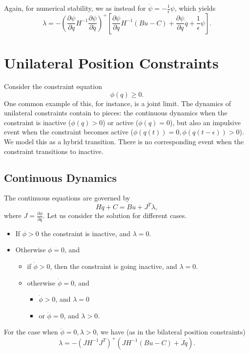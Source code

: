 \documentclass{article}
\newcommand{\pd}[2]{\frac{\partial #1}{\partial #2}}
\begin{document}
Again, for numerical stability, we as instead for $\dot{\psi} =
-\frac{1}{\epsilon} \psi$, which yields
$$\lambda = - \left( \pd{\psi}{\dot{q}} H^{-1} \pd{\psi}{\dot{q}}
  \right)^+ \left[ \pd{\psi}{\dot{q}} H^{-1} (Bu - C) + \pd{\psi}{q}
    \dot{q} + \frac{1}{\epsilon} \psi \right].$$

\section{Unilateral Position Constraints}

Consider the constraint equation $$\phi(q) \ge 0.$$ One common example
of this, for instance, is a joint limit.  The dynamics of unilateral
constraints contain to pieces: the continuous dynamics when the
constraint is inactive ($\phi(q) > 0$) or active ($\phi(q) = 0$), but
also an impulsive event when the constraint becomes active
($\phi(q(t))=0, \phi(q(t-\epsilon))>0$).  We model this as a hybrid
transition.  There is no corresponding
event when the constraint transitions to inactive.  

\subsection{Continuous Dynamics}

The continuous equations are governed by $$H\ddot{q} + C = B u + J^T
\lambda,$$ where $J = \pd{\phi}{q}$.  
Let us consider the solution for different cases.  
\begin{itemize}
\item If $\phi > 0$ the constraint is inactive, and $\lambda = 0$.  
\item Otherwise $\phi = 0$, and 
\begin{itemize}
\item if $\dot{\phi} > 0$, then the constraint is going inactive, and
  $\lambda = 0$.  
\item otherwise $\dot{\phi} = 0$, and 
\begin{itemize}
\item $\ddot{\phi} > 0$, and $\lambda = 0$
\item or $\ddot{\phi} = 0$, and $\lambda > 0$.  
\end{itemize}
\end{itemize}
\end{itemize}
For the case when $\ddot{\phi} = 0, \lambda > 0$, we have (as in the
bilateral position constraints) $$\lambda =- (J
H^{-1} J^T)^+ (J H^{-1} (Bu - C) + \dot{J}\dot{q}).$$
\end{document}
